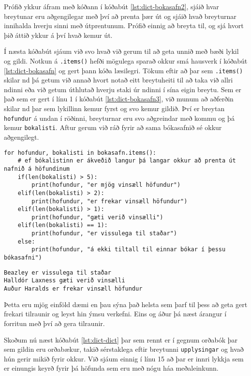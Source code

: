 Prófið ykkur áfram með kóðann í kóðabút \ref{lst:dict-bokasafn2}, sjáið hvar breytunar eru aðgengilegar með því að prenta þær út og sjáið hvað breyturnar innihalda hverju sinni með útprentunum.
Prófið einnig að breyta til, og sjá hvort þið áttið ykkur á því hvað kemur út.

Í næsta kóðabút sjáum við svo hvað við gerum til að geta unnið með bæði lykil og gildi.
Notkun á \texttt{.items()} hefði mögulega sparað okkur smá hausverk í kóðabút \ref{lst:dict-bokasafn} og gert þann kóða læsilegri.
Tökum eftir að þar sem \texttt{.items()} skilar nd þá getum við annað hvort notað eitt breytuheiti til að taka við allri ndinni eða við getum úthlutað hverju staki úr ndinni í sína eigin breytu.
Sem er það sem er gert í línu 1 í kóðabút \ref{lst:dict-bokasafn3}, við munum að aðferðin skilar nd þar sem lykillinn kemur fyrst og svo kemur gildið.
Því er breytan \texttt{hofundur} á undan í röðinni, breyturnar eru svo aðgreindar með kommu og þá kemur \texttt{bokalisti}.
Aftur gerum við ráð fyrir að sama bókasafnið sé okkur aðgengilegt.

\begin{lstlisting}[caption=Ítrun í gegnum orðabækur með .items(), label=lst:dict-bokasafn3]
for hofundur, bokalisti in bokasafn.items():
	# ef bókalistinn er ákveðið langur þá langar okkur að prenta út nafnið á höfundinum
	if(len(bokalisti) > 5):
		print(hofundur, "er mjög vinsæll höfundur")
	elif(len(bokalisti) > 2):
		print(hofundur, "er frekar vinsæll höfundur")
	elif(len(bokalisti) > 1):
		print(hofundur, "gæti verið vinsælli")
	elif(len(bokalisti) == 1):
		print(hofundur, "er vissulega til staðar")
	else:
		print(hofundur, "á ekki tiltall til einnar bókar í þessu bókasafni")
\end{lstlisting}
\lstset{style=uttak}
\begin{lstlisting}
Beazley er vissulega til staðar
Halldór Laxness gæti verið vinsælli
Auður Haralds er frekar vinsæll höfundur
\end{lstlisting}
\lstset{style=venjulegt}

Þetta eru mjög einföld dæmi en þau sýna það helsta sem þarf til þess að geta gert frekari tilraunir og leyst hin ýmsu verkefni.
Eins og áður þá næst árangur í forritun með því að gera tilraunir.

Skoðum nú næst kóðabút \ref{lst:dict-dict} þar sem rennt er í gegnum orðabók þar sem gildin eru orðabækur, takið sérstaklega eftir breytunni \texttt{upplysingar} og hvað hún gerir mikið fyrir okkur.
Við sjáum einnig í línu 15 að þar er innri lykkja sem er einungis keyrð fyrir þá höfunda sem eru með nógu háa meðaleinkunn.

